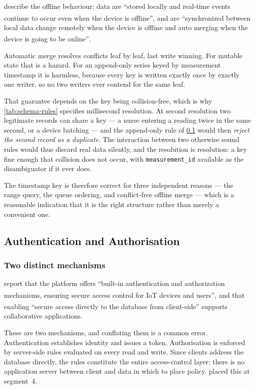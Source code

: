\documentclass[12pt,a4paper,oneside]{report}
\newcommand{\bq}[1]{``#1''\textsuperscript{\dag}}
\begin{document}
\Textcite{efendi2025} describe the offline behaviour: data are \bq{stored locally and real-time events continue to occur even when the device is offline}, and are \bq{synchronized between local data change remotely when the device is offline and auto merging when the device is going to be online}.

Automatic merge resolves conflicts leaf by leaf, last write winning. For mutable state that is a hazard. For an append-only series keyed by measurement timestamp it is harmless, because every key is written exactly once by exactly one writer, so no two writers ever contend for the same leaf.

That guarantee depends on the key being collision-free, which is why \cref{tab:schema-rules} specifies millisecond resolution. At second resolution two legitimate records can share a key --- a nurse entering a reading twice in the same second, or a device batching --- and the append-only rule of \cref{sec:auth} would then \emph{reject the second record as a duplicate}. The interaction between two otherwise sound rules would thus discard real data silently, and the resolution is resolution: a key fine enough that collision does not occur, with \texttt{measurement\_id} available as the disambiguator if it ever does.

The timestamp key is therefore correct for three independent reasons --- the range query, the queue ordering, and conflict-free offline merge --- which is a reasonable indication that it is the right structure rather than merely a convenient one.

\subsection{Authentication and Authorisation}\label{sec:auth}

\subsubsection{Two distinct mechanisms}

\Textcite{efendi2025} report that the platform offers \bq{built-in authentication and authorization mechanisms, ensuring secure access control for IoT devices and users}, and that enabling \bq{secure access directly to the database from client-side} supports collaborative applications.

These are two mechanisms, and conflating them is a common error. Authentication establishes identity and issues a token. Authorisation is enforced by server-side rules evaluated on every read and write. Since clients address the database directly, the rules constitute the entire access-control layer: there is no application server between client and data in which to place policy.  placed this at segment~4.
\end{document}

